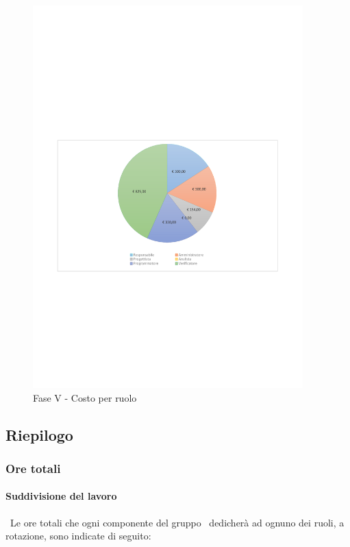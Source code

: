 \documentclass[../PianoProgetto.tex]{subfiles}
\begin{document}
	\begin{figure}[H]
		\centering
		\includegraphics[width=0.93\textwidth , trim=1.5cm 9.5cm 1.5cm 9cm]{grafici/V/V-costo}
			\caption{Fase V - Costo per ruolo}
		\label{fig:CircleChart-faseV_costo}
	\end{figure}	
	
	\subsection{Riepilogo}
			\subsubsection{Ore totali}
				\paragraph{Suddivisione del lavoro}\
					Le ore totali che ogni componente del gruppo \leaf\ dedicherà ad ognuno dei ruoli, a rotazione, sono indicate di seguito:
	
\end{document}
